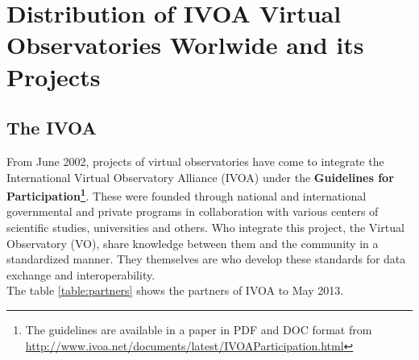 \section{Distribution of IVOA Virtual Observatories Worlwide and its Projects}
\subsection{The IVOA}
From June 2002, projects of virtual observatories have come to integrate the
International Virtual Observatory Alliance (IVOA) under the \textbf{Guidelines
for Participation\footnote{The guidelines are available in a paper in PDF and
DOC format from
\url{http://www.ivoa.net/documents/latest/IVOAParticipation.html}}}. These were
founded through national and international governmental and private programs in
collaboration with various centers of scientific studies, universities and
others. Who integrate this project, the Virtual Observatory (VO), share
knowledge between them and the community in a standardized manner. They
themselves are who develop these standards for data exchange and
interoperability.\\

The table \ref{table:partners} shows the partners of IVOA to May 2013.\\

